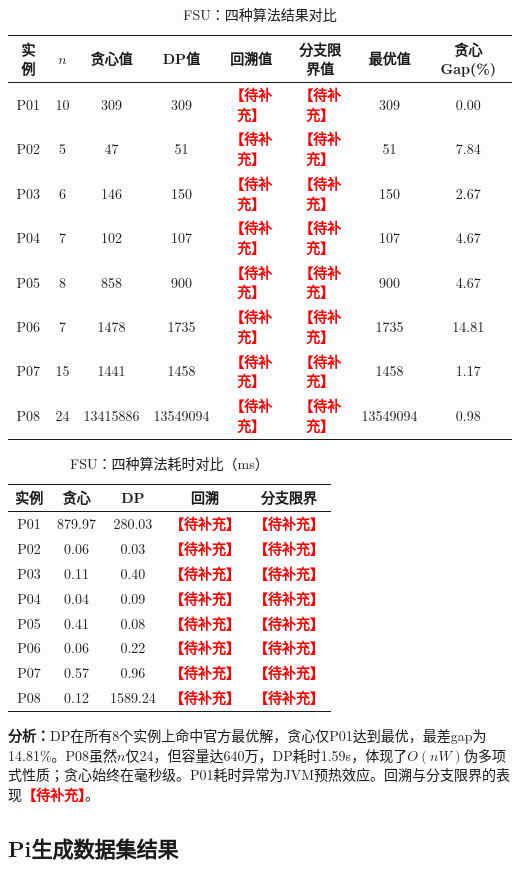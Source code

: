 \documentclass[6pt,a4paper]{ctexart}
\newcommand{\tb}{\textcolor{red}{\textbf{【待补充】}}}
\begin{document}
\begin{table}[ht]
\centering
\caption{FSU：四种算法结果对比}
\begin{tabular}{cccccccc}
\toprule
实例 & $n$ & 贪心值 & DP值 & 回溯值 & 分支限界值 & 最优值 & 贪心Gap(\%) \\
\midrule
P01 & 10 & 309 & 309 & \tb & \tb & 309 & 0.00 \\
P02 & 5 & 47 & 51 & \tb & \tb & 51 & 7.84 \\
P03 & 6 & 146 & 150 & \tb & \tb & 150 & 2.67 \\
P04 & 7 & 102 & 107 & \tb & \tb & 107 & 4.67 \\
P05 & 8 & 858 & 900 & \tb & \tb & 900 & 4.67 \\
P06 & 7 & 1478 & 1735 & \tb & \tb & 1735 & 14.81 \\
P07 & 15 & 1441 & 1458 & \tb & \tb & 1458 & 1.17 \\
P08 & 24 & 13415886 & 13549094 & \tb & \tb & 13549094 & 0.98 \\
\bottomrule
\end{tabular}
\end{table}

\begin{table}[ht]
\centering
\caption{FSU：四种算法耗时对比（ms）}
\begin{tabular}{ccccc}
\toprule
实例 & 贪心 & DP & 回溯 & 分支限界 \\
\midrule
P01 & 879.97 & 280.03 & \tb & \tb \\
P02 & 0.06 & 0.03 & \tb & \tb \\
P03 & 0.11 & 0.40 & \tb & \tb \\
P04 & 0.04 & 0.09 & \tb & \tb \\
P05 & 0.41 & 0.08 & \tb & \tb \\
P06 & 0.06 & 0.22 & \tb & \tb \\
P07 & 0.57 & 0.96 & \tb & \tb \\
P08 & 0.12 & 1589.24 & \tb & \tb \\
\bottomrule
\end{tabular}
\end{table}

\textbf{分析：}DP在所有8个实例上命中官方最优解，贪心仅P01达到最优，最差gap为14.81\%。P08虽然$n$仅24，但容量达640万，DP耗时1.59s，体现了$O(nW)$伪多项式性质；贪心始终在毫秒级。P01耗时异常为JVM预热效应。回溯与分支限界的表现\tb。

\subsection{Pi生成数据集结果}
\end{document}
